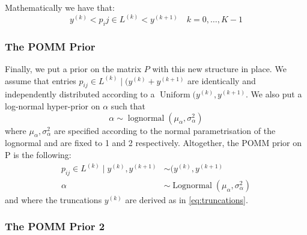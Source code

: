 \documentclass[11pt]{amsart}
\begin{document}
Mathematically we have that:
\begin{equation}
y^{(k)} < p_ij \in L^{(k)} < y^{(k+1)}\quad  k = 0, \ldots, K-1 
\end{equation}

\subsubsection{The POMM Prior}

Finally, we put a prior on the matrix $P$ with this new structure in place.
We assume that entries $p_{ij} \in L^{(k)} \mid (y^{(k)} + y^{(k+1)}$ are identically and independently distributed according to a $\operatorname{Uniform}(y^{(k)},y^{(k+1)}$. We also put a log-normal hyper-prior on $\alpha$ such that 
\begin{equation}
\alpha \sim \operatorname{lognormal}(\mu_\alpha, \sigma^2_\alpha)
\end{equation}
where $\mu_\alpha, \sigma^2_\alpha$ are specified according to the normal parametrisation of the lognormal and are fixed to 1 and 2 respectively.
Altogether, the POMM prior on P is the following:
\begin{align}
p_{ij} \in L^{(k)} \mid y^{(k)},y^{(k+1)} &\sim (y^{(k)},y^{(k+1)} \\
\alpha &\sim \operatorname{Lognormal}\left(\mu_\alpha, \sigma^2_\alpha\right)
\end{align}
and where the truncations $y^{(k)}$ are derived as in \eqref{eq:truncations}.



\subsubsection{The POMM Prior 2}
\end{document}
